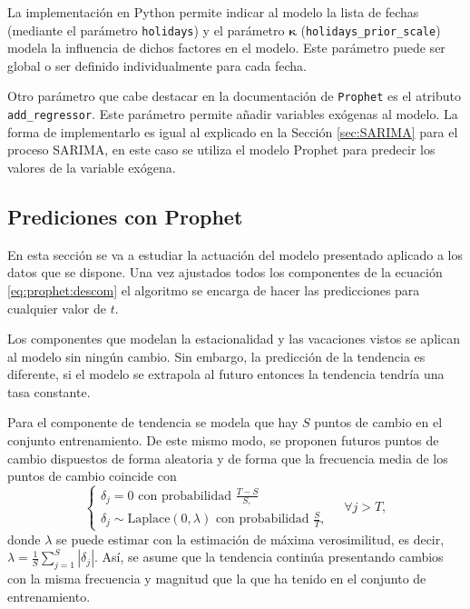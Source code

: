 \documentclass[12pt,twoside]{article}
\newcommand{\abs}[1]{\ensuremath{|#1|}}
\begin{document}
La implementación en Python permite indicar al modelo la lista de fechas (mediante el parámetro \texttt{holidays}) y el parámetro $\boldsymbol{\kappa}$ (\texttt{holidays\_prior\_scale}) modela la influencia de dichos factores en el modelo. Este parámetro puede ser global o ser definido individualmente para cada fecha.

Otro parámetro que cabe destacar en la documentación de \texttt{Prophet} es el atributo \texttt{add\_regressor}. Este parámetro permite añadir variables exógenas al modelo. La forma de implementarlo es igual al explicado en la Sección \ref{sec:SARIMA} para el proceso SARIMA, en este caso se utiliza el modelo Prophet para predecir los valores de la variable exógena. 



\subsection{Prediciones con Prophet}
En esta sección se va a estudiar la actuación del modelo presentado aplicado a los datos que se dispone.  Una vez ajustados todos los componentes de la ecuación \eqref{eq:prophet:descom} el algoritmo se encarga de hacer las predicciones para cualquier valor de $t$.

Los componentes que modelan la estacionalidad y las vacaciones vistos se aplican al modelo sin ningún cambio. Sin embargo, la predicción de la tendencia es diferente, si el modelo se extrapola al futuro entonces la tendencia tendría una tasa constante. 

Para el componente de tendencia se modela que hay $S$ puntos de cambio en el conjunto entrenamiento. De este mismo modo, se proponen futuros puntos de cambio dispuestos de forma aleatoria y de forma que la frecuencia media de los puntos de cambio coincide con
\begin{equation*}
    \left\{\begin{array}{l}
        \delta_j = 0 \text{  con probabilidad  } \frac{T-S}{S,}  \\
         \delta_j \sim \text{Laplace}(0, \lambda) \text{  con probabilidad 
 } \frac{S}{T} ,
    \end{array}\right. \quad \forall j > T,
\end{equation*}
donde $\lambda$ se puede estimar con la estimación de máxima verosimilitud, es decir, $\lambda = \frac{1}{S} \sum_{j=1}^S \abs{\delta_j}$. Así, se asume que la tendencia continúa presentando cambios con la misma frecuencia y magnitud que la que ha tenido en el conjunto de entrenamiento. 
\end{document}
